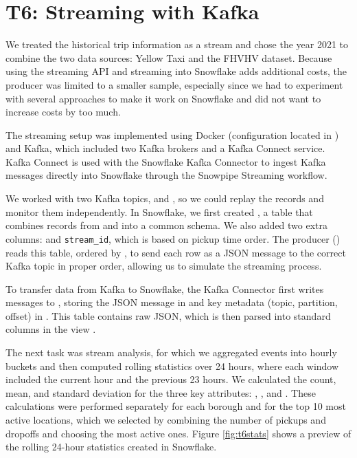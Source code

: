 \documentclass[fleqn,moreauthors,9pt]{ds_report}
\begin{document}
\section*{T6: Streaming with Kafka}

We treated the historical trip information as a stream and chose the year 2021 to combine the two data sources: Yellow Taxi and the FHVHV dataset. Because using the streaming API and streaming into Snowflake adds additional costs, the producer was limited to a smaller sample, especially since we had to experiment with several approaches to make it work on Snowflake and did not want to increase costs by too much.

The streaming setup was implemented using Docker (configuration located in ) and Kafka, which included two Kafka brokers and a Kafka Connect service. Kafka Connect is used with the Snowflake Kafka Connector to ingest Kafka messages directly into Snowflake through the Snowpipe Streaming workflow.

We worked with two Kafka topics,  and , so we could replay the records and monitor them independently. In Snowflake, we first created , a table that combines records from  and  into a common schema. We also added two extra columns:  and \texttt{stream\_id}, which is based on pickup time order. The producer () reads this table, ordered by , to send each row as a JSON message to the correct Kafka topic in proper order, allowing us to simulate the streaming process.

To transfer data from Kafka to Snowflake, the Kafka Connector first writes messages to , storing the JSON message in  and key metadata (topic, partition, offset) in . This table contains raw JSON, which is then parsed into standard columns in the view .

The next task was stream analysis, for which we aggregated events into hourly buckets and then computed rolling statistics over 24 hours, where each window included the current hour and the previous 23 hours. We calculated the count, mean, and standard deviation for the three key attributes: , , and . These calculations were performed separately for each borough and for the top 10 most active locations, which we selected by combining the number of pickups and dropoffs and choosing the most active ones. Figure \ref{fig:t6stats} shows a preview of the rolling 24-hour statistics created in Snowflake. 
\end{document}
